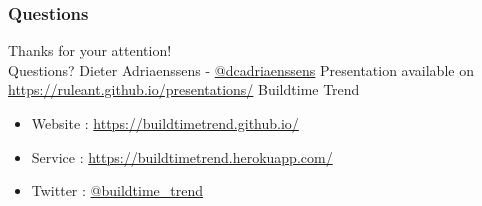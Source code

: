 \documentclass[14pt]{beamer}
\begin{document}
  \begin{frame}
   \frametitle{Questions}
    Thanks for your attention!\\
    Questions?
    \vfill
    Dieter Adriaenssens - \href{https://twitter.com/dcadriaenssens}{\small{@dcadriaenssens}}
    \vfill
    Presentation available on \href{https://ruleant.github.io/presentations/}{\small{https://ruleant.github.io/presentations/}}
    \vfill
    Buildtime Trend
    \begin{itemize}
      \item Website : \href{https://buildtimetrend.github.io/}{\small{https://buildtimetrend.github.io/}}
      \item Service : \href{https://buildtimetrend.herokuapp.com/}{\small{https://buildtimetrend.herokuapp.com/}}
      \item Twitter : \href{https://twitter.com/buildtime_trend}{\small{@buildtime\_trend}}
    \end{itemize}
  \end{frame}
\end{document}
